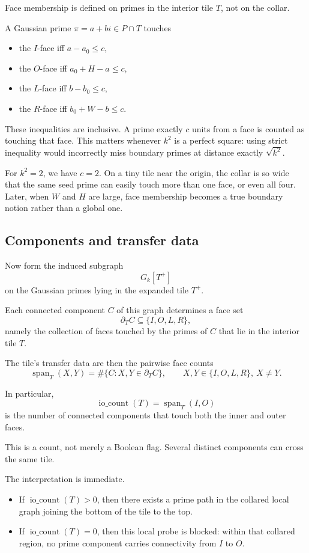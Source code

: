 \documentclass[12pt,letterpaper]{article}
\theoremstyle{definition}
\theoremstyle{remark}
\newcommand{\Gk}{G_k}
\newcommand{\Tplus}{T^+}
\newcommand{\iocount}{\operatorname{io\_count}}
\newcommand{\spn}{\operatorname{span}}
\newcommand{\Pk}{P}
\begin{document}
Face membership is defined on primes in the interior tile $T$, not on the collar.

A Gaussian prime $\pi=a+bi\in \Pk\cap T$ touches

\begin{itemize}
\item the $I$-face iff $a-a_0\le c$,
\item the $O$-face iff $a_0+H-a\le c$,
\item the $L$-face iff $b-b_0\le c$,
\item the $R$-face iff $b_0+W-b\le c$.
\end{itemize}

These inequalities are inclusive. A prime exactly $c$ units from a face is counted as touching that face. This matters whenever $k^2$ is a perfect square: using strict inequality would incorrectly miss boundary primes at distance exactly $\sqrt{k^2}$.

For $k^2=2$, we have $c=2$. On a tiny tile near the origin, the collar is so wide that the same seed prime can easily touch more than one face, or even all four. Later, when $W$ and $H$ are large, face membership becomes a true boundary notion rather than a global one.

\subsection{Components and transfer data}

Now form the induced subgraph
\[
\Gk[\Tplus]
\]
on the Gaussian primes lying in the expanded tile $\Tplus$.

Each connected component $C$ of this graph determines a face set
\[
\partial_T C \subseteq \{I,O,L,R\},
\]
namely the collection of faces touched by the primes of $C$ that lie in the interior tile $T$.

The tile's transfer data are then the pairwise face counts
\[
\spn_T(X,Y)
=
\#\{C : X,Y\in \partial_T C\},
\qquad X,Y\in\{I,O,L,R\},\ X\ne Y.
\]

In particular,
\[
\iocount(T)=\spn_T(I,O)
\]
is the number of connected components that touch both the inner and outer faces.

This is a count, not merely a Boolean flag. Several distinct components can cross the same tile.

The interpretation is immediate.

\begin{itemize}
\item If $\iocount(T)>0$, then there exists a prime path in the collared local graph joining the bottom of the tile to the top.
\item If $\iocount(T)=0$, then this local probe is blocked: within that collared region, no prime component carries connectivity from $I$ to $O$.
\end{itemize}
\end{document}
